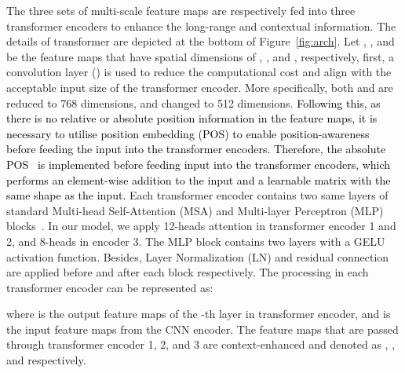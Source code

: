 \documentclass{article}
\begin{document}
The three sets of multi-scale feature maps are respectively fed into three transformer encoders to enhance the long-range and contextual information. The details of transformer are depicted at the bottom of Figure~\ref{fig:arch}. 
Let , , and  be the feature maps that have spatial dimensions of , , and , respectively, 
first, a  convolution layer () is used to reduce the computational cost and align with the acceptable input size of the transformer encoder. 
More specifically, both  and  are reduced to 768 dimensions, and  changed to 512 dimensions. 
\textcolor{black}{Following this, as there is no relative or absolute position information in the feature maps, it is necessary to utilise position embedding (POS) to enable position-awareness before feeding the input into the transformer encoders. Therefore, the absolute POS~\cite{ViT} is implemented before feeding input into the transformer encoders, which performs an element-wise addition to the input and a learnable matrix with the same shape as the input.}
Each transformer encoder contains two same layers of 
standard Multi-head Self-Attention (MSA) and Multi-layer Perceptron (MLP) blocks~\cite{ViT}. 
In our model, we apply 12-heads attention in transformer encoder 1 and 2, and 8-heads in encoder 3.
The MLP block contains two layers with a GELU activation function. Besides, Layer Normalization (LN) and residual connection are applied before and after each block respectively. 
The processing in each transformer encoder can be represented as:





where  is the output feature maps of the -th layer in transformer encoder, and  is the input feature maps from the CNN encoder. 
The feature maps that are passed through transformer encoder 1, 2, and 3 are context-enhanced and denoted as , , and  respectively.
\end{document}

